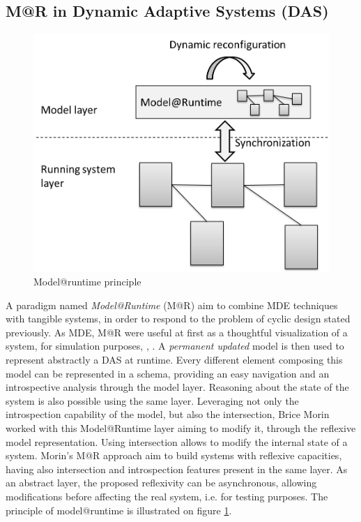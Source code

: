 \subsection{M@R in Dynamic Adaptive Systems (DAS)}
\begin{figure}[htb]
	\centering
	\includegraphics[width=0.65\columnwidth]{chapters/stateOfTheArt.images/MAR_Overview.png}
	\caption{Model@runtime principle \label{fig:MAROverview}} 
\end{figure}

A paradigm named \textit{Model@Runtime} (M@R) aim to combine MDE techniques with tangible systems, in order to respond to the problem of cyclic design stated previously.
As MDE, M@R were useful at first as a thoughtful visualization of a system, for simulation purposes\cite{oreizy1999architecture}, \cite{blair2009models}, \cite{zhang2006model}.
A \textit{permanent updated} model is then used to represent abstractly a DAS at runtime.
Every different element composing this model can be represented in a schema, providing an easy navigation and an introspective analysis through the model layer.
Reasoning about the state of the system is also possible using the same layer.
Leveraging not only the introspection capability of the model, but also the intersection, Brice Morin\cite{morin2010leveraging} worked with this Model@Runtime layer aiming to modify it, through the reflexive model representation.
Using intersection allows to modify the internal state of a system\cite{paepcke1993object}.
Morin's M@R approach aim to build systems with reflexive capacities, having also intersection and introspection features present in the same layer.
As an abstract layer, the proposed reflexivity can be asynchronous, allowing modifications before affecting the real system, i.e. for testing purposes. 
The principle of model@runtime is illustrated on figure \ref{fig:MAROverview}.

